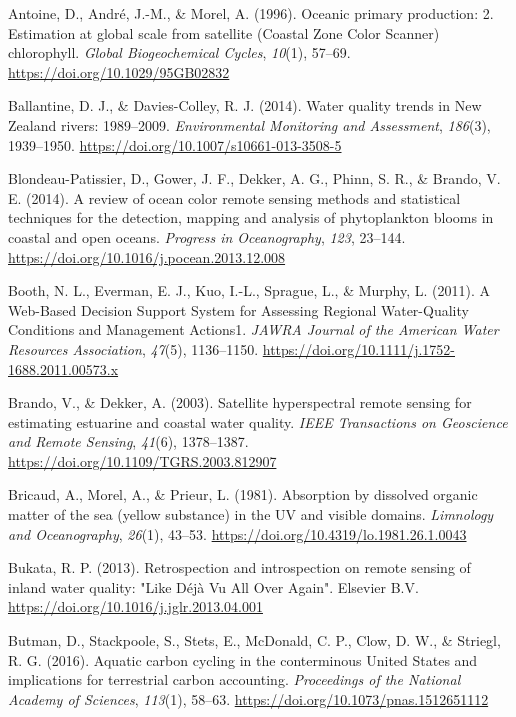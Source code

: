 \documentclass[]{article}
\begin{document}
\hypertarget{refs}{}
\leavevmode\hypertarget{ref-Antoine1996}{}%
Antoine, D., André, J.-M., \& Morel, A. (1996). Oceanic primary
production: 2. Estimation at global scale from satellite (Coastal Zone
Color Scanner) chlorophyll. \emph{Global Biogeochemical Cycles},
\emph{10}(1), 57--69. \url{https://doi.org/10.1029/95GB02832}

\leavevmode\hypertarget{ref-Ballantine2014}{}%
Ballantine, D. J., \& Davies-Colley, R. J. (2014). Water quality trends
in New Zealand rivers: 1989--2009. \emph{Environmental Monitoring and
Assessment}, \emph{186}(3), 1939--1950.
\url{https://doi.org/10.1007/s10661-013-3508-5}

\leavevmode\hypertarget{ref-Blondeau-Patissier2014}{}%
Blondeau-Patissier, D., Gower, J. F., Dekker, A. G., Phinn, S. R., \&
Brando, V. E. (2014). A review of ocean color remote sensing methods and
statistical techniques for the detection, mapping and analysis of
phytoplankton blooms in coastal and open oceans. \emph{Progress in
Oceanography}, \emph{123}, 23--144.
\url{https://doi.org/10.1016/j.pocean.2013.12.008}

\leavevmode\hypertarget{ref-Booth2011}{}%
Booth, N. L., Everman, E. J., Kuo, I.-L., Sprague, L., \& Murphy, L.
(2011). A Web-Based Decision Support System for Assessing Regional
Water-Quality Conditions and Management Actions1. \emph{JAWRA Journal of
the American Water Resources Association}, \emph{47}(5), 1136--1150.
\url{https://doi.org/10.1111/j.1752-1688.2011.00573.x}

\leavevmode\hypertarget{ref-Brando2003}{}%
Brando, V., \& Dekker, A. (2003). Satellite hyperspectral remote sensing
for estimating estuarine and coastal water quality. \emph{IEEE
Transactions on Geoscience and Remote Sensing}, \emph{41}(6),
1378--1387. \url{https://doi.org/10.1109/TGRS.2003.812907}

\leavevmode\hypertarget{ref-Bricaud1981}{}%
Bricaud, A., Morel, A., \& Prieur, L. (1981). Absorption by dissolved
organic matter of the sea (yellow substance) in the UV and visible
domains. \emph{Limnology and Oceanography}, \emph{26}(1), 43--53.
\url{https://doi.org/10.4319/lo.1981.26.1.0043}

\leavevmode\hypertarget{ref-Bukata2013}{}%
Bukata, R. P. (2013). Retrospection and introspection on remote sensing
of inland water quality: "Like Déjà Vu All Over Again". Elsevier B.V.
\url{https://doi.org/10.1016/j.jglr.2013.04.001}

\leavevmode\hypertarget{ref-Butman2016}{}%
Butman, D., Stackpoole, S., Stets, E., McDonald, C. P., Clow, D. W., \&
Striegl, R. G. (2016). Aquatic carbon cycling in the conterminous United
States and implications for terrestrial carbon accounting.
\emph{Proceedings of the National Academy of Sciences}, \emph{113}(1),
58--63. \url{https://doi.org/10.1073/pnas.1512651112}
\end{document}
